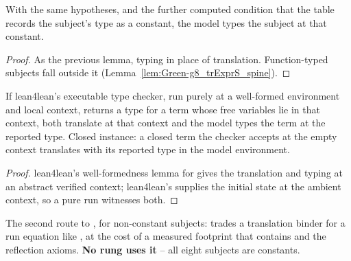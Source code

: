 \begin{lemma}\label{lem:Witness-hasType_const_of_table}
 \leanok
{}
With the same hypotheses, and the further computed condition that the table records the subject's
type as a constant, the model types the subject at that constant.
\end{lemma}

\begin{proof} \leanok
{}
 As the previous lemma, typing in place of translation. Function-typed subjects fall
outside it (Lemma~\ref{lem:Green-g8_trExprS_spine}).
\end{proof}

\begin{lemma}\label{lem:Witness-trTyping_of_checkType_run}
 \leanok
{}
If lean4lean's executable type checker, run purely at a well-formed environment and local context,
returns a type for a term whose free variables lie in that context, both translate at that context
and the model types the term at the reported type. Closed instance: a closed term the checker accepts
at the empty context translates with its reported type in the model environment.
\end{lemma}

\begin{proof} \leanok
{}
 lean4lean's well-formedness lemma for  gives the translation and typing
at an abstract verified context; lean4lean's  supplies the initial state at the
ambient context, so a pure  run witnesses both.
\end{proof}

\begin{remark}
 The second route to , for non-constant subjects: trades a translation binder
for a run equation like , at the cost of a measured footprint that contains 
and the reflection axioms. \textbf{No rung uses it} -- all eight subjects are constants.
\end{remark}



